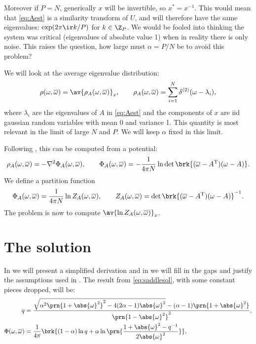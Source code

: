 \documentclass[12pt]{article}
\newcommand{\inv}{^{-1}}
\newcommand{\trans}{^\mathrm{T}}
\newcommand{\omb}{\overline{\omega}}
\newcommand{\oas}{\abs{\omega}^2}
\newcommand{\opo}{\prn{1+\abs{\omega}^2}}
\newcommand{\omo}{\prn{1-\abs{\omega}^2}}
\begin{document}
Moreover if $P=N$, generically $x$ will be invertible, so $x^*=x\inv$.
This would mean that \eqref{eq:Aest} is a similarity transform of $U$, and will therefore have the same eigenvalues: $\exp(2\pi\ir k/P)$ for $k\in\Z_P$.
We would be fooled into thinking the system was critical (eigenvalues of absolute value 1) when in reality there is only noise.
This raises the question, how large must $\alpha=P/N$ be to avoid this problem?

We will look at the average eigenvalue distribution:
%
\begin{equation}\label{eq:eigdist}
  \rho(\omega,\omb) = \av{\rho_A(\omega,\omb)}_x,
  \qquad
  \rho_A(\omega,\omb) = \sum_{i=1}^N \delta^{(2)}(\omega-\lambda_i),
\end{equation}
%
where $\lambda_i$ are the eigenvalues of $A$ in \eqref{eq:Aest} and
the components of $x$ are iid gaussian random variables with mean 0 and variance 1.
This quantity is most relevant in the limit of large $N$ and $P$.
We will keep $\alpha$ fixed in this limit.

Following \cite{Sommers1988asymmetric}, this can be computed from a potential:
%
\begin{equation}\label{eq:potential}
  \rho_A(\omega,\omb) = -\nabla^2 \Phi_A(\omega,\omb),
  \qquad
  \Phi_A(\omega,\omb) = -\frac{1}{4\pi N} \ln\det \brk{(\omb-A\trans)(\omega-A)}.
\end{equation}
%
We define a partition function
%
\begin{equation}\label{eq:partfn}
  \Phi_A(\omega,\omb) = \frac{1}{4\pi N} \ln Z_A(\omega,\omb),
  \qquad
  Z_A(\omega,\omb) = \det \brk{(\omb-A\trans)(\omega-A)}\inv.
\end{equation}
%
The problem is now to compute $\av{\ln Z_A(\omega,\omb)}_x$.


\section{The solution}\label{sec:solution}

In  we will present a simplified derivation and in  we will fill in the gaps and justify the assumptions used in .
The result from \eqref{eq:saddlesol}, with some constant pieces dropped, will be:
%
\begin{equation}\label{eq:phisol}
\begin{aligned}
  q &= \frac{ \sqrt{\alpha^2\opo^2 - 4(2\alpha-1)\oas} - (\alpha-1)\opo }{\omo^2},\\
  \Phi(\omega,\omb) &= \frac{1}{4\pi}\brk{ (1-\alpha)\ln q +\alpha\ln\prn{\frac{1+\abs{\omega}^2-q\inv}{2\oas}} },
\end{aligned}
\end{equation}
\end{document}

